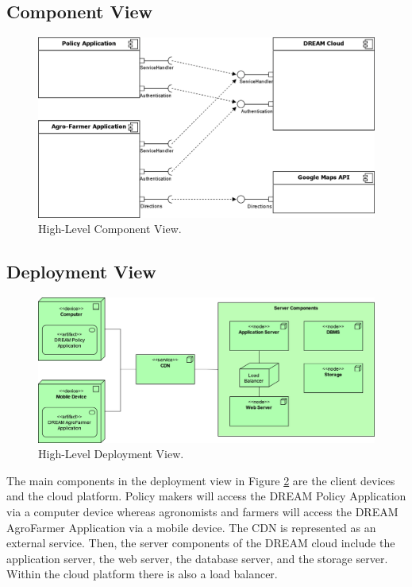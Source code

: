 \subsection{Component View}

\begin{figure}[hbt!]
\centering
\includegraphics[width=\textwidth]{../images_diagrams/dd/high_level_cloud.png}
\caption{High-Level Component View.}
\label{fig:highLevelComp}
\end{figure}

\subsection{Deployment View}
\begin{figure}[hbt!]
\centering
\includegraphics[width=\textwidth]{../images_diagrams/dd/highlevel_deployment.png}
\caption{High-Level Deployment View.}
\label{fig:highLevelDeploy}
\end{figure}

\begin{flushleft}
The main components in the deployment view in Figure \ref{fig:highLevelDeploy} are the client devices and the cloud platform. Policy makers will access the DREAM Policy Application via a computer device whereas agronomists and farmers will access the DREAM AgroFarmer Application via a mobile device. The CDN is represented as an external service. Then, the server components of the DREAM cloud include the application server, the web server, the database server, and the storage server. Within the cloud platform there is also a load balancer.
\end{flushleft}



